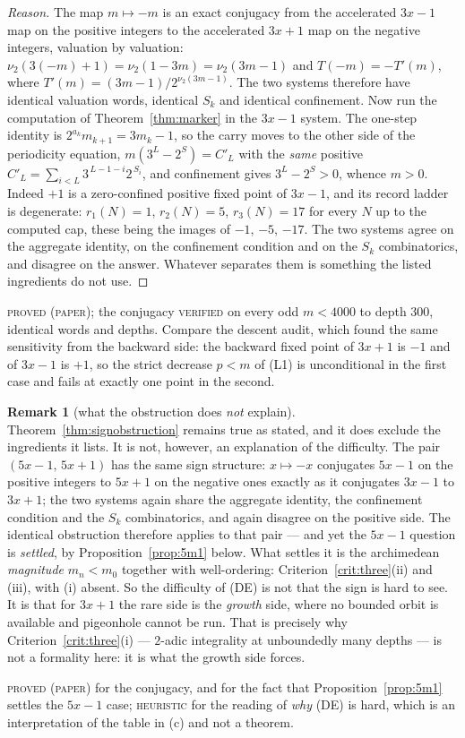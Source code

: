 \documentclass[11pt,reqno]{amsart}
\theoremstyle{plain}
\theoremstyle{definition}
\newtheorem{remark}[theorem]{Remark}
\newcommand{\vt}{\nu_2}
\newcommand{\lab}[1]{\textnormal{\textsc{\small #1}}}
\begin{document}
\begin{proof}[Reason]
The map $m\mapsto -m$ is an exact conjugacy from the accelerated $3x-1$ map on the
positive integers to the accelerated $3x+1$ map on the negative integers,
valuation by valuation: $\vt(3(-m)+1)=\vt(1-3m)=\vt(3m-1)$ and $T(-m)=-T'(m)$,
where $T'(m)=(3m-1)/2^{\vt(3m-1)}$. The two systems therefore have identical
valuation words, identical $S_k$ and identical confinement. Now run the
computation of Theorem~\ref{thm:marker} in the $3x-1$ system. The one-step
identity is $2^{a_k}m_{k+1}=3m_k-1$, so the carry moves to the other side of the
periodicity equation, $m(3^{L}-2^{S})=C'_L$ with the \emph{same} positive
$C'_L=\sum_{i<L}3^{\,L-1-i}2^{\,S_i}$, and confinement gives $3^{L}-2^{S}>0$,
whence $m>0$. Indeed $+1$ is a zero-confined positive fixed point of $3x-1$, and
its record ladder is degenerate: $r_1(N)=1$, $r_2(N)=5$, $r_3(N)=17$ for every
$N$ up to the computed cap, these being the images of $-1$, $-5$, $-17$. The two
systems agree on the aggregate identity, on the confinement condition and on the
$S_k$ combinatorics, and disagree on the answer. Whatever separates them is
something the listed ingredients do not use.
\end{proof}
\lab{proved (paper)}; the conjugacy \lab{verified} on every odd $m<4000$ to depth
$300$, identical words and depths. Compare the descent audit, which found the same
sensitivity from the backward side: the backward fixed point of $3x+1$ is $-1$ and
of $3x-1$ is $+1$, so the strict decrease $p<m$ of (L1) is unconditional in the
first case and fails at exactly one point in the second.

\begin{remark}[what the obstruction does \emph{not} explain]\label{rem:notenough}
Theorem~\ref{thm:signobstruction} remains true as stated, and it does exclude the
ingredients it lists. It is not, however, an explanation of the difficulty. The
pair $(5x-1,\,5x+1)$ has the same sign structure: $x\mapsto-x$ conjugates $5x-1$ on
the positive integers to $5x+1$ on the negative ones exactly as it conjugates
$3x-1$ to $3x+1$; the two systems again share the aggregate identity, the
confinement condition and the $S_k$ combinatorics, and again disagree on the
positive side. The identical obstruction therefore applies to that pair --- and yet
the $5x-1$ question is \emph{settled}, by Proposition~\ref{prop:5m1} below. What
settles it is the archimedean \emph{magnitude} $m_n<m_0$ together with
well-ordering: Criterion~\ref{crit:three}(ii) and (iii), with (i) absent. So the
difficulty of (DE) is not that the sign is hard to see. It is that for $3x+1$ the
rare side is the \emph{growth} side, where no bounded orbit is available and
pigeonhole cannot be run. That is precisely why Criterion~\ref{crit:three}(i) ---
$2$-adic integrality at unboundedly many depths --- is not a formality here: it is
what the growth side forces.
\end{remark}
\lab{proved (paper)} for the conjugacy, and for the fact that
Proposition~\ref{prop:5m1} settles the $5x-1$ case; \lab{heuristic} for the reading
of \emph{why} \textup{(DE)} is hard, which is an interpretation of the table in (c)
and not a theorem.
\end{document}
